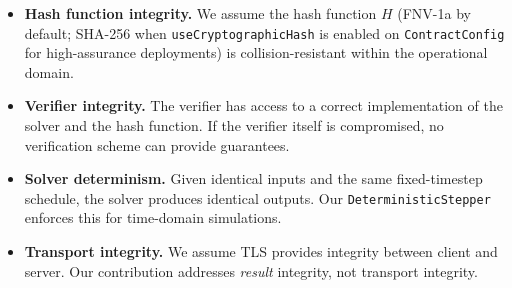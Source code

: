 \documentclass[letterpaper,twocolumn,10pt]{article}
\begin{document}
\begin{itemize}[nosep,leftmargin=*]
\item \textbf{Hash function integrity.} We assume the hash function $H$
  (FNV-1a by default; SHA-256 when \texttt{useCryptographicHash} is
  enabled on \texttt{ContractConfig} for high-assurance deployments)
  is collision-resistant within the operational domain.
\item \textbf{Verifier integrity.} The verifier has access to a correct
  implementation of the solver and the hash function. If the verifier itself
  is compromised, no verification scheme can provide guarantees.
\item \textbf{Solver determinism.} Given identical inputs and the same
  fixed-timestep schedule, the solver produces identical outputs. Our
  \texttt{DeterministicStepper} enforces this for time-domain simulations.
\item \textbf{Transport integrity.} We assume TLS provides integrity between
  client and server. Our contribution addresses \emph{result} integrity, not
  transport integrity.
\end{itemize}
\end{document}
